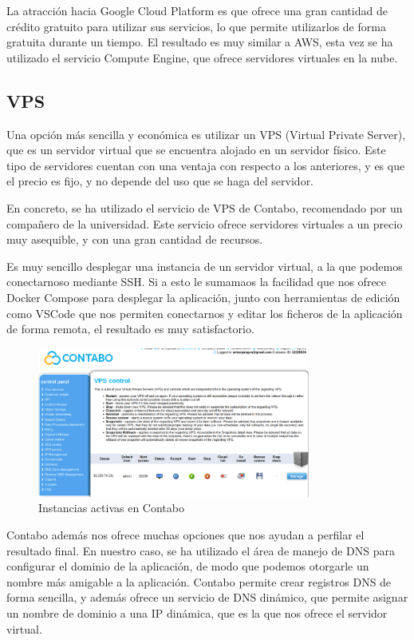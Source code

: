La atracción hacia Google Cloud Platform es que ofrece una gran cantidad de crédito gratuito para utilizar sus servicios, lo que permite utilizarlos de forma gratuita durante un tiempo.
El resultado es muy similar a AWS, esta vez se ha utilizado el servicio Compute Engine, que ofrece servidores virtuales en la nube.


\subsection{VPS}
Una opción más sencilla y económica es utilizar un VPS (Virtual Private Server), que es un servidor virtual que se encuentra alojado en un servidor físico.
Este tipo de servidores cuentan con una ventaja con respecto a los anteriores, y es que el precio es fijo, y no depende del uso que se haga del servidor.

En concreto, se ha utilizado el servicio de VPS de Contabo, recomendado por un compañero de la universidad.
Este servicio ofrece servidores virtuales a un precio muy asequible, y con una gran cantidad de recursos.

Es muy sencillo desplegar una instancia de un servidor virtual, a la que podemos conectarnoso mediante SSH.
Si a esto le sumamaos la facilidad que nos ofrece Docker Compose para desplegar la aplicación, junto con herramientas de edición como VSCode que nos permiten conectarnos y 
editar los ficheros de la aplicación de forma remota, el resultado es muy satisfactorio.

\begin{figure}[H]
    \centering
    \includegraphics[width=0.8\textwidth]{cap3/images/contabo-instance.png}
    \caption{Instancias activas en Contabo}
    \label{fig:contabo}
\end{figure}

Contabo además nos ofrece muchas opciones que nos ayudan a perfilar el resultado final.
En nuestro caso, se ha utilizado el área de manejo de DNS para configurar el dominio de la aplicación, de modo que podemos otorgarle un nombre más amigable a la aplicación.
Contabo permite crear registros DNS de forma sencilla, y además ofrece un servicio de DNS dinámico, que permite asignar un nombre de dominio a una IP dinámica, que es la que nos ofrece el servidor virtual.

